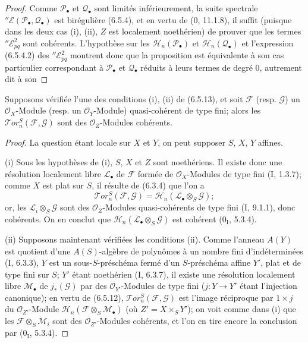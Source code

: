 \begin{proof}
Comme $\mathscr P_\bullet$ et $\mathscr Q_\bullet$ sont limités
inférieurement, la suite spectrale
$''\mathscr E(\mathscr P_\bullet,\mathscr Q_\bullet)$ est birégulière (6.5.4),
et en vertu de (0, 11.1.8), il suffit (puisque dans les deux cas (i), (ii), $Z$
est localement noethérien) de prouver que les termes
$''\mathscr E_{pq}^2$ sont cohérents. L'hypothèse sur les
$\mathscr H_n(\mathscr P_\bullet)$ et
$\mathscr H_n(\mathscr Q_\bullet)$ et l'expression (6.5.4.2) des
$''\mathscr E_{pq}^2$ montrent donc que la proposition est équivalente à son
cas particulier correspondant à $\mathscr P_\bullet$ et
$\mathscr Q_\bullet$ réduits à leurs termes de degré 0, autrement dit à son
\end{proof}

\begin{corollary}[6.5.14]
Supposons vérifiée l'une des conditions (i), (ii) de (6.5.13), et soit
$\mathscr F$ (resp. $\mathscr G$) un $\mathscr O_X$-Module (resp. un
$\mathscr O_Y$-Module) quasi-cohérent de type fini; alors les
$\mathscr{T}\!or_n^S(\mathscr F,\mathscr G)$ sont des $\mathscr O_Z$-Modules
cohérents.
\end{corollary}

\begin{proof}
La question étant locale sur $X$ et $Y$, on peut supposer $S$, $X$, $Y$
affines.

\textnormal{(i)} Sous les hypothèses de (i), $S$, $X$ et $Z$ sont noethériens.
Il existe donc une résolution localement libre $\mathscr L_\bullet$ de
$\mathscr F$ formée de $\mathscr O_X$-Modules de type fini (I, 1.3.7); comme
$X$ est plat sur $S$, il résulte de (6.3.4) que l'on a
\[
  \mathscr{T}\!or_n^S(\mathscr F,\mathscr G)
  =\mathscr H_n(\mathscr L_\bullet\otimes_S\mathscr G);
\]
or, les $\mathscr L_i\otimes_S\mathscr G$ sont des $\mathscr O_Z$-Modules
quasi-cohérents de type fini (I, 9.1.1), donc cohérents. On en conclut que
$\mathscr H_n(\mathscr L_\bullet\otimes_S\mathscr G)$ est cohérent
($0_{\mathrm I}$, 5.3.4).

\textnormal{(ii)} Supposons maintenant vérifiées les conditions (ii). Comme
l'anneau $A(Y)$ est quotient d'une $A(S)$-algèbre de polynômes à un nombre fini
d'indéterminées (I, 6.3.3), $Y$ est un sous-$S$-préschéma fermé d'un
$S$-préschéma affine $Y'$, plat et de type fini sur $S$; $Y'$ étant noethérien
(I, 6.3.7), il existe une résolution localement libre $\mathscr M_\bullet$ de
$j_*(\mathscr G)$ par des $\mathscr O_{Y'}$-Modules de type fini
($j:Y\to Y'$ étant l'injection canonique); en vertu de (6.5.12),
$\mathscr{T}\!or_n^S(\mathscr F,\mathscr G)$ est l'image réciproque par
$1\times j$ du $\mathscr O_{Z'}$-Module
$\mathscr H_n(\mathscr F\otimes_S\mathscr M_\bullet)$ (où
$Z'=X\times_S Y'$); on voit comme dans (i) que les
$\mathscr F\otimes_S\mathscr M_i$ sont des $\mathscr O_{Z'}$-Modules
cohérents, et l'on en tire encore la conclusion par ($0_{\mathrm I}$, 5.3.4).
\end{proof}

